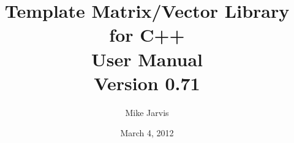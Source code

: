 \documentclass[twoside,letterpaper,11pt]{article}
\newcommand{\tmvversion}{0.71}
\begin{document}
\title{Template Matrix/Vector Library for C++ \\ User Manual \\ Version \tmvversion}
\author{Mike Jarvis}
\date{March 4, 2012}
\maketitle

\tableofcontents

\newpage


\newpage


\newpage


\newpage


\newpage


\newpage


\newpage


\newpage


\newpage


\newpage


\newpage


\newpage


\newpage


\newpage


\newpage


\newpage


\newpage


\newpage


\newpage


\newpage
\printindex
\end{document}
